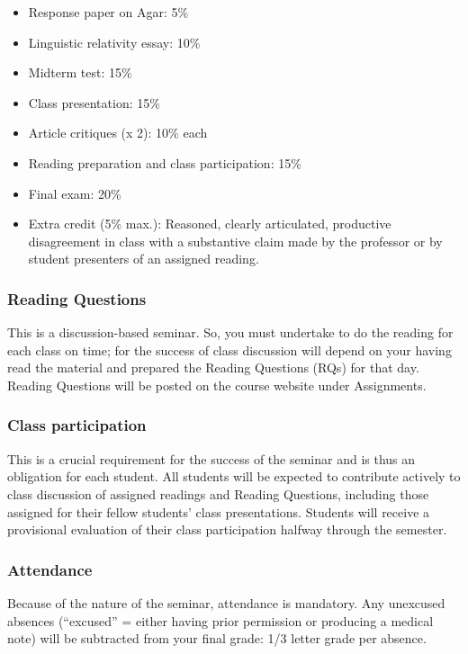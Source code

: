\documentclass[doc,12pt]{apa6}
\providecommand{\tightlist}{%
  \setlength{\itemsep}{0pt}\setlength{\parskip}{0pt}}
\begin{document}
\begin{itemize}
\tightlist
\item
  Response paper on Agar: 5\%
\item
  Linguistic relativity essay: 10\%
\item
  Midterm test: 15\%
\item
  Class presentation: 15\%
\item
  Article critiques (x 2): 10\% each
\item
  Reading preparation and class participation: 15\%
\item
  Final exam: 20\%
\item
  Extra credit (5\% max.): Reasoned, clearly articulated, productive
  disagreement in class with a substantive claim made by the professor
  or by student presenters of an assigned reading.
\end{itemize}

\subsubsection{Reading Questions}\label{reading-questions}

This is a discussion-based seminar. So, you must undertake to do the
reading for each class on time; for the success of class discussion will
depend on your having read the material and prepared the Reading
Questions (RQs) for that day. Reading Questions will be posted on the
course website under Assignments.

\subsubsection{Class participation}\label{class-participation}

This is a crucial requirement for the success of the seminar and is thus
an obligation for each student. All students will be expected to
contribute actively to class discussion of assigned readings and Reading
Questions, including those assigned for their fellow students' class
presentations. Students will receive a provisional evaluation of their
class participation halfway through the semester.

\subsubsection{Attendance}\label{attendance}

Because of the nature of the seminar, attendance is mandatory. Any
unexcused absences (``excused'' = either having prior permission or
producing a medical note) will be subtracted from your final grade: 1/3
letter grade per absence.
\end{document}
